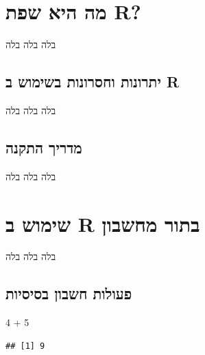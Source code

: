 \documentclass[
]{book}
\newenvironment{Shaded}{\begin{snugshade}}{\end{snugshade}}
\newcommand{\DecValTok}[1]{\textcolor[rgb]{0.00,0.00,0.81}{#1}}
\newcommand{\SpecialCharTok}[1]{\textcolor[rgb]{0.00,0.00,0.00}{#1}}
\begin{document}
\hypertarget{ux5deux5d4-ux5d4ux5d9ux5d0-ux5e9ux5e4ux5ea-r}{%
\chapter{מה היא שפת R?}\label{ux5deux5d4-ux5d4ux5d9ux5d0-ux5e9ux5e4ux5ea-r}}

בלה בלה בלה

\hypertarget{ux5d9ux5eaux5e8ux5d5ux5e0ux5d5ux5ea-ux5d5ux5d7ux5e1ux5e8ux5d5ux5e0ux5d5ux5ea-ux5d1ux5e9ux5d9ux5deux5d5ux5e9-ux5d1-r}{%
\section{יתרונות וחסרונות בשימוש ב R}\label{ux5d9ux5eaux5e8ux5d5ux5e0ux5d5ux5ea-ux5d5ux5d7ux5e1ux5e8ux5d5ux5e0ux5d5ux5ea-ux5d1ux5e9ux5d9ux5deux5d5ux5e9-ux5d1-r}}

בלה בלה בלה

\hypertarget{ux5deux5d3ux5e8ux5d9ux5da-ux5d4ux5eaux5e7ux5e0ux5d4}{%
\section{מדריך התקנה}\label{ux5deux5d3ux5e8ux5d9ux5da-ux5d4ux5eaux5e7ux5e0ux5d4}}

בלה בלה בלה

\hypertarget{ux5e9ux5d9ux5deux5d5ux5e9-ux5d1-r-ux5d1ux5eaux5d5ux5e8-ux5deux5d7ux5e9ux5d1ux5d5ux5df}{%
\chapter{שימוש ב R בתור מחשבון}\label{ux5e9ux5d9ux5deux5d5ux5e9-ux5d1-r-ux5d1ux5eaux5d5ux5e8-ux5deux5d7ux5e9ux5d1ux5d5ux5df}}

בלה בלה בלה

\hypertarget{ux5e4ux5e2ux5d5ux5dcux5d5ux5ea-ux5d7ux5e9ux5d1ux5d5ux5df-ux5d1ux5e1ux5d9ux5e1ux5d9ux5d5ux5ea}{%
\section{פעולות חשבון בסיסיות}\label{ux5e4ux5e2ux5d5ux5dcux5d5ux5ea-ux5d7ux5e9ux5d1ux5d5ux5df-ux5d1ux5e1ux5d9ux5e1ux5d9ux5d5ux5ea}}

\begin{Shaded}
\begin{Highlighting}[]
\DecValTok{4} \SpecialCharTok{+} \DecValTok{5}
\end{Highlighting}
\end{Shaded}

\begin{verbatim}
## [1] 9
\end{verbatim}
\end{document}
